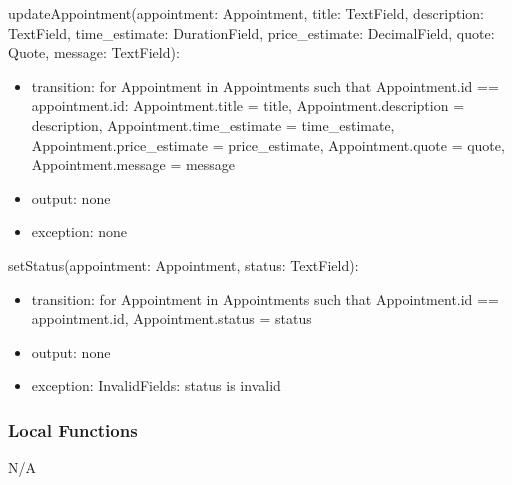\documentclass[12pt, titlepage]{article}
\begin{document}
\noindent updateAppointment(appointment: Appointment, title: TextField, description: TextField, time\_estimate: DurationField, price\_estimate: DecimalField, quote: Quote, message: TextField):
\begin{itemize}
    \item transition: for Appointment in Appointments such that Appointment.id == appointment.id: Appointment.title = title, Appointment.description = description, Appointment.time\_estimate = time\_estimate, Appointment.price\_estimate = price\_estimate, Appointment.quote = quote, Appointment.message = message
    \item output: none
    \item exception: none
\end{itemize}

\noindent setStatus(appointment: Appointment, status: TextField):
\begin{itemize}
    \item transition: for Appointment in Appointments such that Appointment.id == appointment.id, Appointment.status = status
    \item output: none
    \item exception: InvalidFields: status is invalid
\end{itemize}

\subsubsection{Local Functions}

N/A

\newpage 





\end{document}
